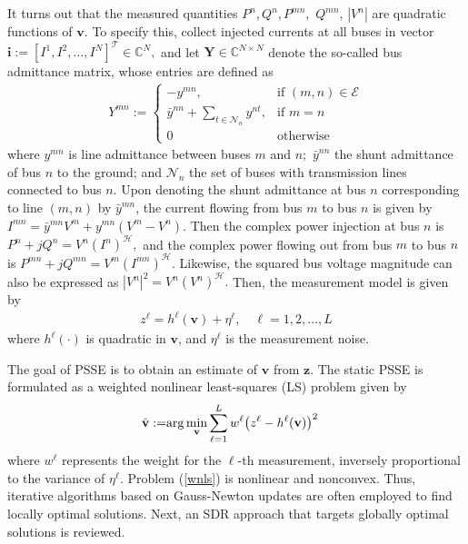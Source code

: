 \documentclass[conference]{IEEEtran}
\def\ccalE{{\ensuremath{\mathcal E}}}
\def\ccalH{{\ensuremath{\mathcal H}}}
\def\ccalN{{\ensuremath{\mathcal N}}}
\def\ccalT{{\ensuremath{\mathcal T}}}
\def\bbY{{\ensuremath{\mathbf Y}}}
\def\bbi{{\ensuremath{\mathbf i}}}
\def\bbv{{\ensuremath{\mathbf v}}}
\def\bbz{{\ensuremath{\mathbf z}}}
\begin{document}
It turns out that the measured quantities $P^n, Q^n, P^{mn},$ $ Q^{mn}$, $|V^n|$ are quadratic functions of $\bbv.$ To specify this, collect injected currents at all buses in vector $\bbi:=[I^1,I^2,\ldots,I^N]^\ccalT\in\mathbb{C}^N,$ and let $\bbY\in\mathbb{C}^{N\times N}$ denote the so-called bus admittance matrix, whose entries are defined as
\begin{align}
Y^{mn}:=\left\{\begin{array}{ll}
-y^{mn},&{\text{if~}}(m,n)\in\ccalE\\
\bar{y}^{nn}+\sum_{t\in\ccalN_n}y^{nt},&{\text{if~}}m=n\\
0&{\text{otherwise}}
\end{array}\right.
\end{align}
where $y^{mn}$ is line admittance between buses $m$ and $n;$ $\bar{y}^{nn}$ the shunt admittance of bus $n$ to the ground; and $\ccalN_n$ the set of buses with transmission lines connected to bus $n.$ Upon denoting the shunt admittance at bus $n$ corresponding to line $(m,n)$ by $\bar{y}^{mn}$, the current flowing from bus $m$ to bus $n$ is given by $I^{mn}=\bar{y}^{mn}V^m+y^{mn}(V^m-V^n).$ Then the complex power injection at bus $n$ is $P^n+jQ^n=V^n(I^n)^\ccalH,$ and the complex power flowing out from bus $m$ to bus $n$ is $P^{mn}+jQ^{mn}=V^m(I^{mn})^\ccalH.$ Likewise, the squared bus voltage magnitude can also be expressed as $|V^n|^2=V^n(V^n)^\ccalH.$ Then, the measurement model is given by
\begin{align}
z^\ell=h^\ell(\bbv)+\eta^\ell,\quad \ell=1,2,\ldots, L
\end{align}
where $h^\ell(\cdot)$ is quadratic in $\bbv$, and $\eta^\ell$ is the measurement noise.




The goal of PSSE is to obtain an estimate of $\bbv$ from $\bbz.$ The static PSSE is formulated as a weighted nonlinear least-squares (LS) problem given by
\begin{align}
\hat\bbv:=&{\rm{arg}}\mathop{\rm{min}}
\limits_{\bbv}\sum_{\ell=1}^L w^\ell\big(z^\ell-h^\ell(\bbv)\big)^2\label{wnls} \end{align}
where $w^\ell$ represents the weight for the $\ell$-th measurement, inversely proportional to the variance of $\eta^\ell.$ Problem (\ref{wnls}) is nonlinear and nonconvex. Thus, iterative algorithms based on Gauss-Newton updates are often employed to find locally optimal solutions. Next, an SDR approach that targets globally optimal solutions is reviewed.
\end{document}
